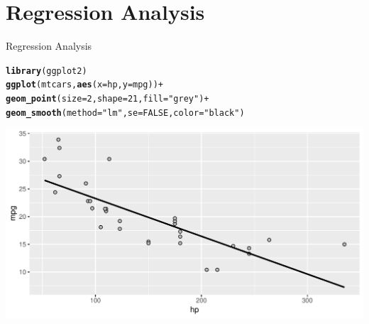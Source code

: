 \documentclass[12pt]{beamer}\usepackage[]{graphicx}\usepackage[]{color}
\makeatletter
\newcommand{\hlnum}[1]{\textcolor[rgb]{0.686,0.059,0.569}{#1}}%
\newcommand{\hlstr}[1]{\textcolor[rgb]{0.192,0.494,0.8}{#1}}%
\newcommand{\hlopt}[1]{\textcolor[rgb]{0,0,0}{#1}}%
\newcommand{\hlstd}[1]{\textcolor[rgb]{0.345,0.345,0.345}{#1}}%
\newcommand{\hlkwc}[1]{\textcolor[rgb]{0.333,0.667,0.333}{#1}}%
\newcommand{\hlkwd}[1]{\textcolor[rgb]{0.737,0.353,0.396}{\textbf{#1}}}%
\newenvironment{kframe}{%
 \def\at@end@of@kframe{}%
 \ifinner\ifhmode%
  \def\at@end@of@kframe{\end{minipage}}%
  \begin{minipage}{\columnwidth}%
 \fi\fi%
 \def\FrameCommand##1{\hskip\@totalleftmargin \hskip-\fboxsep
 \colorbox{shadecolor}{##1}\hskip-\fboxsep
     \hskip-\linewidth \hskip-\@totalleftmargin \hskip\columnwidth}%
 \MakeFramed {\advance\hsize-\width
   \@totalleftmargin\z@ \linewidth\hsize
   \@setminipage}}%
 {\par\unskip\endMakeFramed%
 \at@end@of@kframe}
\newenvironment{knitrout}{}{} %
\makeatother
\begin{document}
\section{Regression Analysis}


\begin{frame}\Huge\centering
Regression Analysis
\end{frame}


\begin{frame}[fragile]\tiny

\begin{knitrout}
\color{fgcolor}\begin{kframe}
\begin{alltt}
\hlkwd{library}\hlstd{(ggplot2)}
\hlkwd{ggplot}\hlstd{(mtcars,} \hlkwd{aes}\hlstd{(}\hlkwc{x}\hlstd{=hp,} \hlkwc{y}\hlstd{=mpg) )} \hlopt{+}
  \hlkwd{geom_point}\hlstd{(}\hlkwc{size}\hlstd{=}\hlnum{2}\hlstd{,} \hlkwc{shape}\hlstd{=}\hlnum{21}\hlstd{,} \hlkwc{fill}\hlstd{=}\hlstr{"grey"}\hlstd{)} \hlopt{+}
  \hlkwd{geom_smooth}\hlstd{(}\hlkwc{method}\hlstd{=}\hlstr{"lm"}\hlstd{,} \hlkwc{se}\hlstd{=}\hlnum{FALSE}\hlstd{,} \hlkwc{color}\hlstd{=}\hlstr{"black"}\hlstd{)}
\end{alltt}
\end{kframe}

{\centering \includegraphics[width=1\textwidth]{figure/unnamed-chunk-24-1} 

}



\end{knitrout}

\end{frame}

\end{document}
